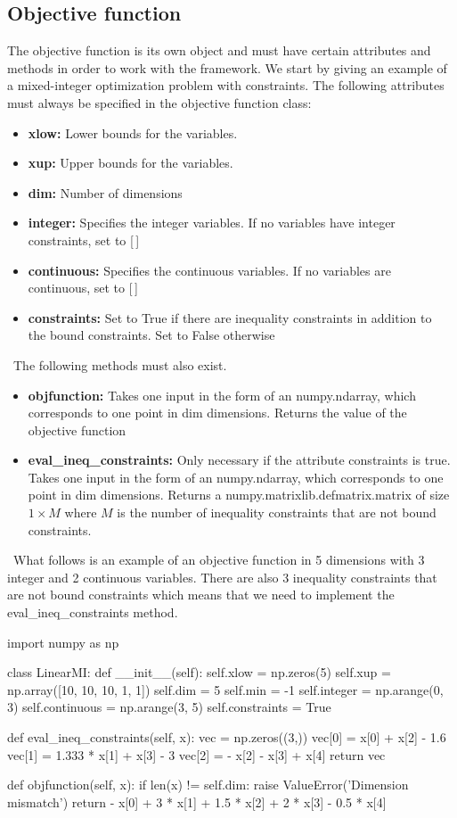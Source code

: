 \documentclass[]{article}
\begin{document}
\subsection{Objective function} The objective function is its own object and must have certain attributes and methods in order to work with the framework. We start by giving an example of a mixed-integer optimization problem with constraints. The following attributes must always be specified in the objective function class:
\begin{itemize}
\item \textbf{xlow:} Lower bounds for the variables.
\item \textbf{xup:} Upper bounds for the variables.
\item \textbf{dim:} Number of dimensions
\item \textbf{integer:} Specifies the integer variables. If no variables have integer constraints, set to [\,]
\item \textbf{continuous:} Specifies the continuous variables. If no variables are continuous, set to [\,]
\item \textbf{constraints:} Set to True if there are inequality constraints in addition to \\ the bound constraints. Set to False otherwise
\end{itemize}
\ \newline The following methods must also exist.
\begin{itemize}
\item \textbf{objfunction:} Takes one input in the form of an numpy.ndarray, which corresponds to one point in dim dimensions. Returns the value of the objective function
\item \textbf{eval\_ineq\_constraints:}  Only necessary if the attribute constraints is true. Takes one input in the form of an numpy.ndarray, which corresponds to one point in dim dimensions. Returns a numpy.matrixlib.defmatrix.matrix of size $1 \times M$ where $M$ is the number of inequality constraints that are not bound constraints. 
\end{itemize}
\ \newline \noindent What follows is an example of an objective function in 5 dimensions with 3 integer and 2 continuous variables. There are also 3 inequality constraints that are not bound constraints which means that we need to implement the eval\_ineq\_constraints method.
\begin{python}
import numpy as np

class LinearMI:
    def __init__(self):
        self.xlow = np.zeros(5)
        self.xup = np.array([10, 10, 10, 1, 1])
        self.dim = 5
        self.min = -1
        self.integer = np.arange(0, 3)
        self.continuous = np.arange(3, 5)
        self.constraints = True

    def eval_ineq_constraints(self, x):
        vec = np.zeros((3,))
        vec[0] = x[0] + x[2] - 1.6
        vec[1] = 1.333 * x[1] + x[3] - 3
        vec[2] = - x[2] - x[3] + x[4]
        return vec

    def objfunction(self, x):
        if len(x) != self.dim:
            raise ValueError('Dimension mismatch')
        return - x[0] + 3 * x[1] + 1.5 * x[2] + 2 * x[3] - 0.5 * x[4]
\end{python}
\end{document}
